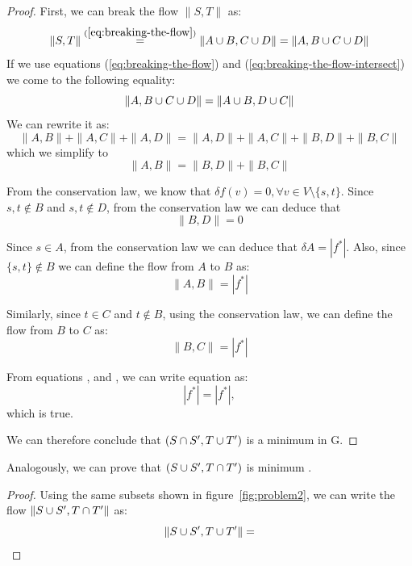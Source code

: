 \begin{proof}
First, we can break the flow $\|S,T\|$ as:
\begin{equation}
\| S, T \| \overset{(\ref{eq:breaking-the-flow})}{=} \| A \cup B , C \cup D \| = \| A, B \cup C \cup D \|
\end{equation}
If we use equations (\ref{eq:breaking-the-flow}) and (\ref{eq:breaking-the-flow-intersect}) we come to the following equality:
\begin{equation}
\| A, B \cup C \cup D \| = \| A \cup B, D \cup C \|
\end{equation}
We can rewrite it as:
\begin{equation}
\| A, B \| + \| A, C \| + \| A, D \| = \| A, D \| + \| A, C\| + \| B, D \|  + \| B, C \|
\end{equation}
which we simplify to
\begin{equation}
\| A, B\| = \| B, D \| + \| B, C \|
\label{eq:simplified-flow}
\end{equation}

From the conservation law, we know that $\delta f(v)=0, \forall v \in V \setminus \{s,t\}$.
Since ${s,t} \notin B$ and ${s,t} \notin D$, from the conservation law we can deduce that 
\begin{equation}
\| B, D \| = 0
\label{eq:bd-is-zero}
\end{equation}

Since $s \in A$, from the conservation law we can deduce that $\delta A = |f^{*}|$. Also, since $\{s, t \} \notin B$ we can define the flow from $A$ to $B$ as:
\begin{equation}
\| A, B \| = |f^{*}|
\label{eq:ab-is-f}
\end{equation}

Similarly, since $t \in C$ and $t \notin B$, using the conservation law, we can define the flow from $B$ to $C$ as:
\begin{equation}
\| B, C \| = |f^{*}|
\label{eq:bc-is-f}
\end{equation}

From equations ,  and , we can write equation  as:
\begin{equation}
|f^{*}| = |f^{*}|,
\end{equation}
which is true. 

We can therefore conclude that $(S \cap S', T \cup T')$ is a minimum \stcut{} in G.
\end{proof}

Analogously, we can prove that $(S \cup S', T \cap T')$ is minimum \stcut{}.
\begin{proof}
Using the same subsets shown in figure~\ref{fig:problem2}, we can write the flow $\| S \cup S', T \cap T' \|$ as:
\begin{equation}
\| S \cup S', T \cup T' \| = 
\end{equation}
\end{proof}